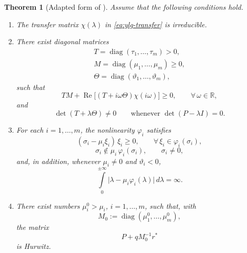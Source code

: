 \documentclass[journal]{IEEEtran}
\theoremstyle{myplain}
\newtheorem{theorem}{Theorem}
\DeclareMathOperator{\diag}{diag}
\begin{document}
\begin{theorem}[Adapted form of {\cite[Theorem~3.1]{YLG}}]
\label{thm:YLG-adapted-faithful}
Assume that the following conditions hold.

\begin{enumerate}
\item[(i)]
The transfer matrix \(\chi(\lambda)\) in \eqref{eq:ylg-transfer} is
irreducible.

\item[(ii)]
There exist diagonal matrices
\begin{multline*}
  T=\diag(\tau_1,\dots,\tau_m)>0,\\
  M=\diag(\mu_1,\dots,\mu_m)\ge 0,\\
  \Theta=\diag(\vartheta_1,\dots,\vartheta_m),
\end{multline*}   
such that
\begin{equation}
  TM + \operatorname{Re}\bigl[(T+i\omega \Theta)\chi(i\omega)\bigr] \ge 0,
  \qquad \forall\,\omega\in\mathbb{R},
  \label{eq:ylg-freq-ineq}
\end{equation}
and
\begin{equation}
  \det(T+\lambda \Theta)\neq 0
  \qquad
  \text{whenever } \det(P-\lambda I)=0.
  \label{eq:ylg-det-cond}
\end{equation}

\item[(iii)]
For each \(i=1,\dots,m\), the nonlinearity \(\varphi_i\) satisfies
\begin{equation}
  (\sigma_i-\mu_i\xi_i)\,\xi_i \ge 0,
  \qquad
  \forall\,\xi_i\in\varphi_i(\sigma_i),
  \label{eq:ylg-sector}
\end{equation}
\begin{equation}
  \sigma_i \notin \mu_i\,\varphi_i(\sigma_i),
  \qquad
  \sigma_i\neq 0,
  \label{eq:ylg-nondeg}
\end{equation}
and, in addition, whenever \(\mu_i\neq 0\) and \(\vartheta_i<0\),
\begin{equation}
  \int\limits_{0}^{\pm\infty}
  \bigl|\lambda-\mu_i\varphi_i(\lambda)\bigr|\,d\lambda
  =\infty.
  \label{eq:ylg-integral}
\end{equation}

\item[(iv)]
There exist numbers \(\mu_i^0>\mu_i\), \(i=1,\dots,m\), such that, with
\[
  M_0:=\diag(\mu_1^0,\dots,\mu_m^0),
\]
the matrix
\begin{equation}
  P + q M_0^{-1} r^{*}
  \label{eq:ylg-hurwitz}
\end{equation}
is Hurwitz.


\end{enumerate}
\end{theorem}
\end{document}
